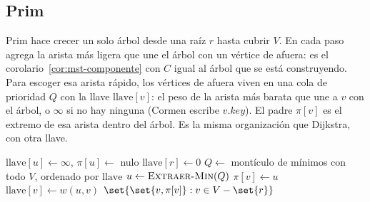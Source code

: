 \documentclass[11pt,letterpaper]{article}
\begin{document}

\subsection*{Prim}

Prim hace crecer un solo árbol desde una raíz $r$ hasta cubrir $V$. En
cada paso agrega la arista más ligera que une el árbol con un vértice
de afuera: es el corolario~\ref{cor:mst-componente} con $C$ igual al
árbol que se está construyendo. Para escoger esa arista rápido, los
vértices de afuera viven en una cola de prioridad $Q$ con la llave
$\text{llave}[v]$: el peso de la arista más barata que une a $v$ con el
árbol, o $\infty$ si no hay ninguna (Cormen escribe $v.key$). El padre
$\pi[v]$ es el extremo de esa arista dentro del árbol. Es la misma
organización que Dijkstra, con otra llave.

\begin{algorithm}[H]
\caption{\textsc{MST-Prim}$(G, w, r)$}
\label{alg:mst-prim}
\begin{algorithmic}[1]
    \State $\text{llave}[u] \gets \infty$, \quad $\pi[u] \gets$ nulo
  \EndFor
  \State $\text{llave}[r] \gets 0$
  \State $Q \gets$ montículo de mínimos con todo $V$, ordenado por
         $\text{llave}$
    \State $u \gets \textsc{Extraer-Min}(Q)$
        \State $\pi[v] \gets u$
        \State $\text{llave}[v] \gets w(u, v)$
      \EndIf
    \EndFor
  \EndWhile
  \State \Return $\set{\set{v, \pi[v]} : v \in V - \set{r}}$
\EndProcedure
\end{algorithmic}
\end{algorithm}
\end{document}
